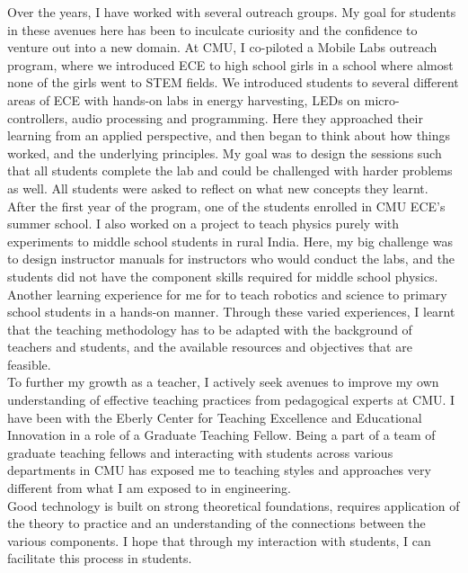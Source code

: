 \documentclass[10pt]{article}
\begin{document}
Over the years, I have worked with several outreach groups. My goal for students in these avenues here has been to inculcate curiosity and the confidence to venture out into a new domain. At CMU, I co-piloted a Mobile Labs outreach program, where we introduced ECE to high school girls in a school where almost none of the girls went to STEM fields. We introduced students to several different areas of ECE with hands-on labs in energy harvesting, LEDs on micro-controllers, audio processing and programming. Here they approached their learning from an applied perspective, and then began to think about how things worked, and the underlying principles. My goal was to design the sessions such that all students complete the lab and could be challenged with harder problems as well. All students were asked to reflect on what new concepts they learnt. After the first year of the program, one of the students enrolled in CMU ECE's summer school. I also worked on a project to teach physics purely with experiments to middle school students in rural India. Here, my big challenge was to design instructor manuals for instructors who would conduct the labs, %
and the students did not have the component skills required for middle school physics. Another learning experience for me for to teach robotics and science to primary school students in a hands-on manner. Through these varied experiences, I learnt that the teaching methodology has to be adapted with the background of teachers and students, and the available resources and objectives that are feasible. \\

To further my growth as a teacher, I actively seek avenues to improve my own understanding of effective teaching practices from pedagogical experts at CMU. I have been with the Eberly Center for Teaching Excellence and Educational Innovation in a role of a Graduate Teaching Fellow. Being a part of a team of graduate teaching fellows and interacting with students across various departments in CMU has exposed me to teaching styles and approaches very different from what I am exposed to in engineering.\\

Good technology is built on strong theoretical foundations, requires application of the theory to practice and an understanding of the connections between the various components. I hope that through my interaction with students, I can facilitate this process in students.
\end{document}
